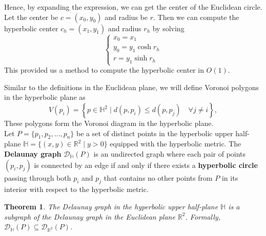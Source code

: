 \documentclass[minted, draw]{hebdomon}
\newcommand{\R}{{\mathbb{R} }}
\newcommand{\HH}{{\mathbb{H} }}
\newtheorem{theorem}{Theorem}
\begin{document}
Hence, by expanding the expression, we can get the center of the Euclidean circle. Let the center be $c = (x_0, y_0)$ and radius be $r$. Then we can compute the hyperbolic center $c_h = (x_1, y_1)$ and radius $r_h$ by solving
\[
\begin{cases}
    x_0 = x_1 \\
    y_0 = y_1 \cosh r_h \\
    r = y_1 \sinh r_h
\end{cases}
\]
This provided us a method to compute the hyperbolic center in $O(1)$.


Similar to the definitions in the Euclidean plane, we will define Voronoi polygons in the hyperbolic plane as
\[
V(p_i) = \left\{ p \in \HH^2 \;\bigg|\; d(p, p_i) \leq d(p, p_j) \quad \forall j \neq i \right\},
\]
These polygons form the Voronoi diagram in the hyperbolic plane. \\

Let \( P = \{p_1, p_2, \ldots, p_n\} \) be a set of distinct points in the hyperbolic upper half-plane \( \HH = \{ (x, y) \in \R^2 \mid y > 0 \} \) equipped with the hyperbolic metric. The \textbf{Delaunay graph} \( \mathcal{D}_{\HH}(P) \) is an undirected graph where each pair of points \( (p_i, p_j) \) is connected by an edge if and only if there exists a \textbf{hyperbolic circle} passing through both \( p_i \) and \( p_j \) that contains no other points from \( P \) in its interior with respect to the hyperbolic metric.

\begin{theorem}
The Delaunay graph in the hyperbolic upper half-plane \( \HH \) is a subgraph of the Delaunay graph in the Euclidean plane \( \R^2 \). Formally, \( \mathcal{D}_{\HH}(P) \subseteq \mathcal{D}_{\R^2}(P) \).
\end{theorem}
\end{document}
